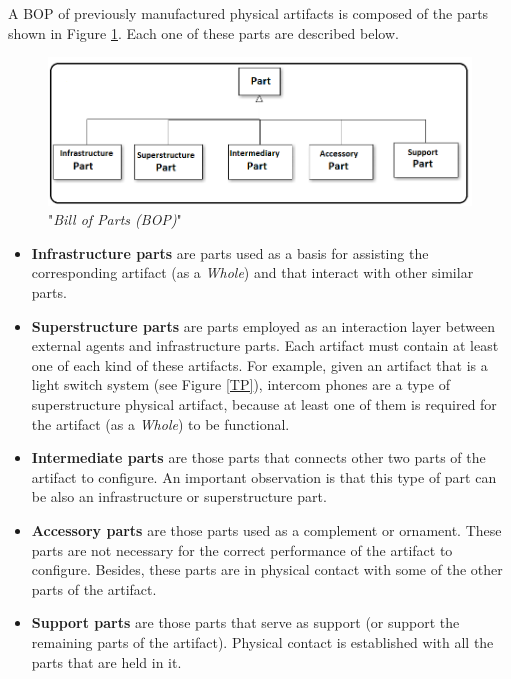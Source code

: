 \documentclass[runningheads,a4paper]{llncs}
\begin{document}
A BOP of previously manufactured physical artifacts is composed of the parts shown in Figure \ref{BPA}. Each one of these parts are described below.
\begin{figure}[h]
\centering
\includegraphics[scale=0.5]{Part2.png}
\caption{"\emph{Bill of Parts (BOP)}"}\label{BPA}
\end{figure}

\begin{itemize}
  \item \textbf{Infrastructure parts} are parts used as a basis for assisting the corresponding artifact (as a \textit{Whole}) and that interact with other similar parts.  
 \item \textbf{Superstructure parts} are parts employed as an interaction layer between external agents and infrastructure parts. Each artifact must contain at least one of each kind of these artifacts. For example, given an artifact that is a light switch system (see Figure \ref{TP}), intercom phones are a type of superstructure physical artifact, because at least one of them is required for the artifact (as a \textit{Whole}) to be functional.
\item \textbf{Intermediate parts} are those parts that connects other two parts of the artifact to configure. An important observation is that this type of part can be also an infrastructure or superstructure part. 
  \item \textbf{Accessory parts} are those parts used as a complement or ornament. These parts are not necessary for the correct performance of the artifact to configure. Besides, these parts are in physical contact with some of the other parts of the artifact. 
  \item \textbf{Support parts} are those parts that serve as support (or support the remaining parts of the artifact). Physical contact is established with all the parts that are held in it.
\end{itemize}
\end{document}
